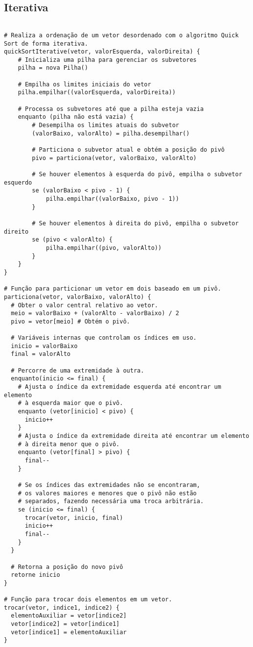 \subsection{Iterativa}
\begin{verbatim}

# Realiza a ordenação de um vetor desordenado com o algoritmo Quick Sort de forma iterativa.
quickSortIterative(vetor, valorEsquerda, valorDireita) {
    # Inicializa uma pilha para gerenciar os subvetores
    pilha = nova Pilha()
    
    # Empilha os limites iniciais do vetor
    pilha.empilhar((valorEsquerda, valorDireita))
    
    # Processa os subvetores até que a pilha esteja vazia
    enquanto (pilha não está vazia) {
        # Desempilha os limites atuais do subvetor
        (valorBaixo, valorAlto) = pilha.desempilhar()
        
        # Particiona o subvetor atual e obtém a posição do pivô
        pivo = particiona(vetor, valorBaixo, valorAlto)
        
        # Se houver elementos à esquerda do pivô, empilha o subvetor esquerdo
        se (valorBaixo < pivo - 1) {
            pilha.empilhar((valorBaixo, pivo - 1))
        }
        
        # Se houver elementos à direita do pivô, empilha o subvetor direito
        se (pivo < valorAlto) {
            pilha.empilhar((pivo, valorAlto))
        }
    }
}

# Função para particionar um vetor em dois baseado em um pivô.
particiona(vetor, valorBaixo, valorAlto) { 
  # Obter o valor central relativo ao vetor.
  meio = valorBaixo + (valorAlto - valorBaixo) / 2
  pivo = vetor[meio] # Obtém o pivô.

  # Variáveis internas que controlam os índices em uso.
  inicio = valorBaixo
  final = valorAlto 
  
  # Percorre de uma extremidade à outra.
  enquanto(inicio <= final) { 
    # Ajusta o índice da extremidade esquerda até encontrar um elemento 
    # à esquerda maior que o pivô.
    enquanto (vetor[inicio] < pivo) { 
      inicio++
    }
    # Ajusta o índice da extremidade direita até encontrar um elemento 
    # à direita menor que o pivô.
    enquanto (vetor[final] > pivo) {
      final--
    }

    # Se os índices das extremidades não se encontraram, 
    # os valores maiores e menores que o pivô não estão
    # separados, fazendo necessária uma troca arbitrária.
    se (inicio <= final) {
      trocar(vetor, inicio, final)
      inicio++
      final--
    }
  }
  
  # Retorna a posição do novo pivô
  retorne inicio
}
   
# Função para trocar dois elementos em um vetor.
trocar(vetor, indice1, indice2) { 
  elementoAuxiliar = vetor[indice2]
  vetor[indice2] = vetor[indice1]
  vetor[indice1] = elementoAuxiliar
}
    \end{verbatim}